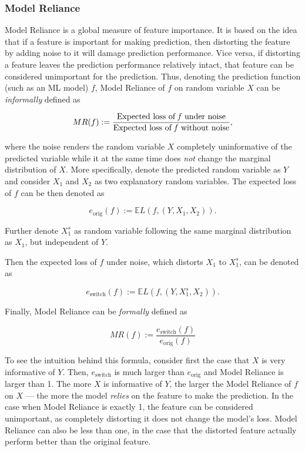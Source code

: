 	\subsubsection{Model Reliance}
		Model Reliance \citep{fisher2019all} is a global measure of feature importance. It is based on the idea that if a feature is important for making prediction, then distorting the feature by adding noise to it will damage prediction performance. Vice versa, if distorting a feature leaves the prediction performance relatively intact, that feature can be considered unimportant for the prediction. Thus, denoting  the prediction function (such as an ML model) $f$, Model Reliance of  $f$ on random variable $X$ can be \textit{informally} defined as
		
		\begin{equation}
			MR(f):=\frac{\text{Expected loss of \textit{f} under noise}}{\text{Expected loss of \textit{f} without noise}},
		\end{equation}
		
		where the noise renders the random variable $X$ completely uninformative of the predicted variable while it at the same time does \textit{not} change the marginal distribution of $X$. More specifically, denote the predicted random variable as $Y$ and consider $X_1$ and $X_2$ as two explanatory random variables. The expected loss of $f$ can be then denoted as 
		
		\begin{equation}
			e_{\text{orig}}(f):= \mathbb{E} L(f,(Y,X_1, X_2)).
		\end{equation} 
		
		Further denote $X_1^s$ as random variable following the same marginal distribution as $X_1$, but independent of $Y$. 
		
		Then the expected loss of $f$ under noise, which distorts $X_1$ to $X_1^s$, can be denoted as 
		
		\begin{equation}
			e_{\text{switch}}(f):= \mathbb{E} L(f,(Y,X_1^s, X_2)).
		\end{equation} 
		
		Finally, Model Reliance can be \textit{formally} defined as 
		
		\begin{equation}
			MR(f):=\frac{e_{\text{switch}}(f)}{e_{\text{orig}}(f)}
		\end{equation}
		
		To see the intuition behind this formula, consider first the case that $X$ is very informative of $Y$. Then, 	$e_{\text{switch}}$ is much larger than $e_{\text{orig}}$ and Model Reliance is larger than 1. The more $X$ is informative of $Y$, the larger the  Model Reliance of $f$ on $X$ --- the more the model \textit{relies} on the feature to make the prediction. In the case when Model Reliance is exactly 1, the feature can be considered unimportant, as completely distorting it does not change the model's loss. Model Reliance can also be less than one, in the case that the distorted feature actually perform better than the original feature.
				
